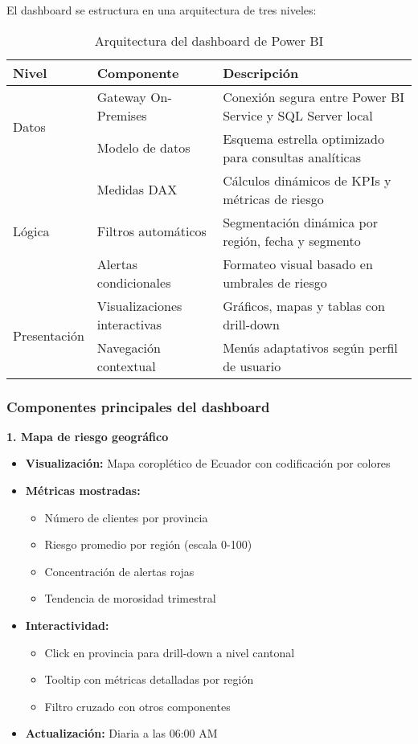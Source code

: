 El dashboard se estructura en una arquitectura de tres niveles:

\begin{table}[ht]
\centering
\begin{tabular}{|p{3cm}|p{4cm}|p{7cm}|}
\hline
\textbf{Nivel} & \textbf{Componente} & \textbf{Descripción} \\
\hline
\multirow{2}{*}{Datos} & Gateway On-Premises & Conexión segura entre Power BI Service y SQL Server local \\
\cline{2-3}
& Modelo de datos & Esquema estrella optimizado para consultas analíticas \\
\hline
\multirow{3}{*}{Lógica} & Medidas DAX & Cálculos dinámicos de KPIs y métricas de riesgo \\
\cline{2-3}
& Filtros automáticos & Segmentación dinámica por región, fecha y segmento \\
\cline{2-3}
& Alertas condicionales & Formateo visual basado en umbrales de riesgo \\
\hline
\multirow{2}{*}{Presentación} & Visualizaciones interactivas & Gráficos, mapas y tablas con drill-down \\
\cline{2-3}
& Navegación contextual & Menús adaptativos según perfil de usuario \\
\hline
\end{tabular}
\caption{Arquitectura del dashboard de Power BI}
\end{table}

\subsubsection{Componentes principales del dashboard}

\textbf{1. Mapa de riesgo geográfico}
\begin{itemize}
    \item \textbf{Visualización:} Mapa coroplético de Ecuador con codificación por colores
    \item \textbf{Métricas mostradas:}
    \begin{itemize}
        \item Número de clientes por provincia
        \item Riesgo promedio por región (escala 0-100)
        \item Concentración de alertas rojas
        \item Tendencia de morosidad trimestral
    \end{itemize}
    \item \textbf{Interactividad:}
    \begin{itemize}
        \item Click en provincia para drill-down a nivel cantonal
        \item Tooltip con métricas detalladas por región
        \item Filtro cruzado con otros componentes
    \end{itemize}
    \item \textbf{Actualización:} Diaria a las 06:00 AM
\end{itemize}

